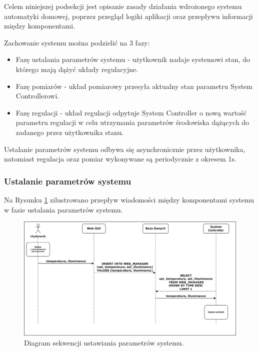     Celem niniejszej podsekcji jest opisanie zasady działania wdrożonego systemu automatyki domowej, poprzez przegląd logiki aplikacji oraz przepływu informacji między komponentami.
    
    Zachowanie systemu można podzielić na 3 fazy:
    \begin{itemize}
        \item Fazę ustalania parametrów systemu - użytkownik nadaje systemowi stan, do którego mają dążyć układy regulacyjne.
        \item Fazę pomiarów - układ pomiarowy przesyła aktualny stan parametru System Controllerowi.
        \item Fazę regulacji - układ regulacji odpytuje System Controller o nową wartość parametru regulacji w celu utrzymania parametrów środowiska dążących do zadanego przez użytkownika stanu.
    \end{itemize}

    Ustalanie parametrów systemu odbywa się asynchronicznie przez użytkownika, natomiast regulacja oraz pomiar wykonywane są periodycznie z okresem 1s.

        \subsubsection{Ustalanie parametrów systemu}

            Na Rysunku \ref{fig:seq-user-webgui-db} zilustrowano przepływ wiadomości między komponentami systemu w fazie ustalania parametrów systemu.

            \begin{figure}[H]
                \centering
                \includegraphics[width=0.8\linewidth]{graphics/sequence-diagrams/user-webgui-db-diagram.png}
                \caption{Diagram sekwencji ustawiania parametrów systemu.}
                \label{fig:seq-user-webgui-db}
            \end{figure}

